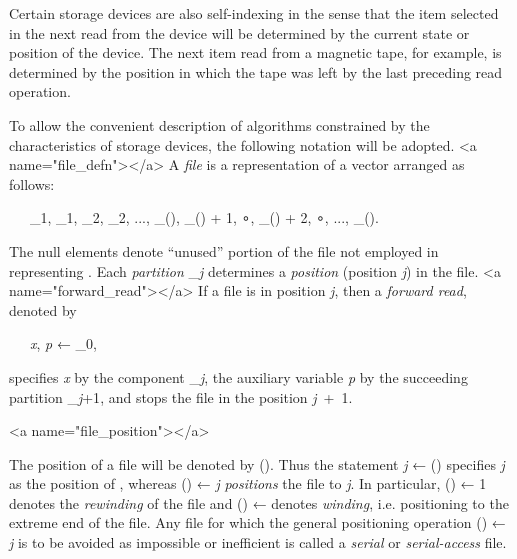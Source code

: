 \par Certain storage devices are also self-indexing in the sense that the item selected in the next read from the device will be determined by the current state or position of the device. The next item read from a magnetic tape, for example, is determined by the position in which the tape was left by the last preceding read operation.

\par To allow the convenient description of algorithms constrained by the characteristics of storage devices, the following notation will be adopted.
<a name="file_defn"></a> A \textit{file} is a representation of a vector  arranged as follows:

\par \ \ \ 
_{1}, _{1},
_{2}, _{2}, ...,
\mathbf{x}_{\textit{\nu}()}, 
_{\textit{\nu}() + 1}, ∘, 
_{\textit{\nu}(\mathbf{x}) + 2}, 
∘, ..., _{\textit{\nu}(\mathbf{p})}.

\par The null elements denote ``unused'' portion of the file not employed in representing . Each \textit{partition} _{\textit{j}} determines a \textit{position} (position \textit{j}) in the file.
<a name="forward_read"></a> If a file \textbf{\Phi} is in position \textit{j}, then a \textit{forward read}, denoted by

\par \ \ \ 
\textit{x}, \textit{p} ← _{0}\textbf{\Phi},

\par specifies \textit{x} by the component 
_{\textit{j}}, the auxiliary variable \textit{p} by the succeeding partition
\mathbf{p}_{\textit{j}+1}, and stops the file in the position \textit{j}\ +\ 1.

<a name="file_position"></a>
\par The position of a file \textbf{\Phi} will be denoted by \textit{\pi}(\textbf{\Phi}). Thus the statement 
\textit{j} ← \textit{\pi}(\textbf{\Phi}) specifies \textit{j} as the position of \textbf{\Phi}, whereas 
\textit{\pi}(\textbf{\Phi}) ← \textit{j}
\textit{positions} the file to \textit{j}. In particular, \textit{\pi}(\textbf{\Phi}) ← 1 denotes the \textit{rewinding} of the file and
\textit{\pi}(\textbf{\Phi}) ← \textit{\nu} denotes \textit{winding}, i.e. positioning to the extreme end of the file. Any file for which the general positioning operation
\textit{\pi}(\textbf{\Phi}) ← \textit{j} is to be avoided as impossible or inefficient is called a \textit{serial} or \textit{serial-access} file.

